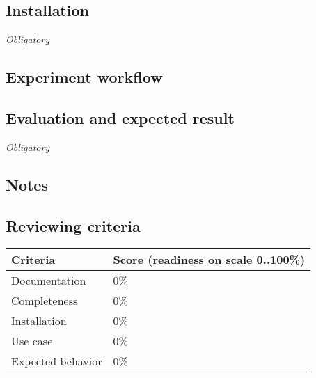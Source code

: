 \documentclass{sigplanconf}
\begin{document}
\subsection{Installation}

{\em Obligatory}

\subsection{Experiment workflow}

\subsection{Evaluation and expected result}

{\em Obligatory}

\subsection{Notes}

\subsection{Reviewing criteria}

\begin{tabular}{|p{1.0in}|p{1.8in}|}
 \hline

 \textbf{Criteria} & \textbf{Score (readiness on scale 0..100\%)} \\

 \hline
 Documentation & 0\% \\

 \hline
 Completeness & 0\% \\

 \hline
 Installation & 0\% \\

 \hline
 Use case & 0\% \\

 \hline
 Expected behavior & 0\% \\

 \hline
\end{tabular}

\end{document}

